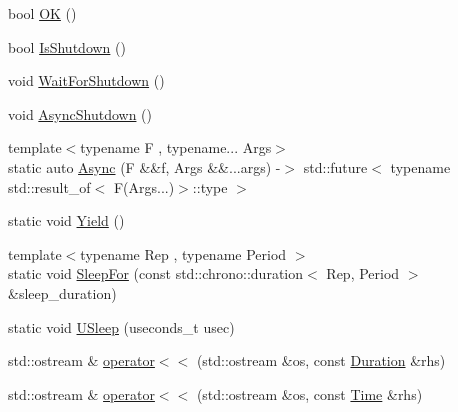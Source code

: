 \begin{DoxyCompactItemize}
bool \hyperlink{namespaceapollo_1_1cyber_aafa5f9962b51918897897bbc0fdd802f}{O\-K} ()
\item 
bool \hyperlink{namespaceapollo_1_1cyber_a05a3487a19d491908fe9ec1f153d13f8}{Is\-Shutdown} ()
\item 
void \hyperlink{namespaceapollo_1_1cyber_a7929114e78a9c595b0ee715968ca2712}{Wait\-For\-Shutdown} ()
\item 
void \hyperlink{namespaceapollo_1_1cyber_afd71fa5ac960cc49a694b5b89432a0f9}{Async\-Shutdown} ()
\item 
{\footnotesize template$<$typename F , typename... Args$>$ }\\static auto \hyperlink{namespaceapollo_1_1cyber_a8b5b35f21374248fa36b7fdb3d5f21a6}{Async} (F \&\&f, Args \&\&...args) -\/$>$ std\-::future$<$ typename std\-::result\-\_\-of$<$ F(Args...)$>$\-::type $>$
\item 
static void \hyperlink{namespaceapollo_1_1cyber_a4ad75a17d884c7111984a87a0b2a752b}{Yield} ()
\item 
{\footnotesize template$<$typename Rep , typename Period $>$ }\\static void \hyperlink{namespaceapollo_1_1cyber_a46edde3971be241b20b04b25cec3beee}{Sleep\-For} (const std\-::chrono\-::duration$<$ Rep, Period $>$ \&sleep\-\_\-duration)
\item 
static void \hyperlink{namespaceapollo_1_1cyber_a2360b37c1f46823b1d05a583e6a8b987}{U\-Sleep} (useconds\-\_\-t usec)
\item 
std\-::ostream \& \hyperlink{namespaceapollo_1_1cyber_a2ba128a679edc562f34ca8ce68e236ff}{operator$<$$<$} (std\-::ostream \&os, const \hyperlink{classapollo_1_1cyber_1_1Duration}{Duration} \&rhs)
\item 
std\-::ostream \& \hyperlink{namespaceapollo_1_1cyber_a0b22e777d32423e0c57c5927fccf63fb}{operator$<$$<$} (std\-::ostream \&os, const \hyperlink{classapollo_1_1cyber_1_1Time}{Time} \&rhs)
\end{DoxyCompactItemize}
